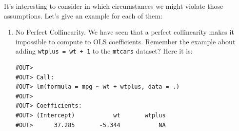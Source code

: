 \documentclass[]{book}
\newenvironment{Shaded}{\begin{snugshade}}{\end{snugshade}}
\newcommand{\DataTypeTok}[1]{\textcolor[rgb]{0.13,0.29,0.53}{#1}}
\newcommand{\DecValTok}[1]{\textcolor[rgb]{0.00,0.00,0.81}{#1}}
\newcommand{\KeywordTok}[1]{\textcolor[rgb]{0.13,0.29,0.53}{\textbf{#1}}}
\newcommand{\NormalTok}[1]{#1}
\newcommand{\OperatorTok}[1]{\textcolor[rgb]{0.81,0.36,0.00}{\textbf{#1}}}
\newcommand{\StringTok}[1]{\textcolor[rgb]{0.31,0.60,0.02}{#1}}
\begin{document}
It's interesting to consider in which circumstances we might violate those assumptions. Let's give an example for each of them:

\begin{enumerate}
\def\labelenumi{\arabic{enumi}.}
\item
  No Perfect Collinearity. We have seen that a perfect collinearity makes it impossible to compute to OLS coefficients. Remember the example about adding \texttt{wtplus\ =\ wt\ +\ 1} to the \texttt{mtcars} dataset? Here it is:

\begin{Shaded}
\end{Shaded}

\begin{verbatim}
#OUT> 
#OUT> Call:
#OUT> lm(formula = mpg ~ wt + wtplus, data = .)
#OUT> 
#OUT> Coefficients:
#OUT> (Intercept)           wt       wtplus  
#OUT>      37.285       -5.344           NA
\end{verbatim}


\end{enumerate}
\end{document}

